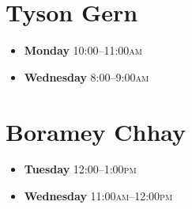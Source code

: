 \documentclass[11pt]{article}
\begin{document}
\drawtitle

\begin{multicols}{2}
  \section*{Tyson Gern}
  \begin{itemize}
  \item \textbf{Monday} 10:00--11:00\textsc{am}
  \item \textbf{Wednesday} 8:00--9:00\textsc{am}
  \end{itemize}
  \phantom{a}
  


  \section*{Boramey Chhay}
  \begin{itemize}
  \item \textbf{Tuesday} 12:00--1:00\textsc{pm}
  \item \textbf{Wednesday} 11:00\textsc{am}--12:00\textsc{pm}
  \end{itemize}
  \phantom{a}
\end{multicols}
\end{document}

